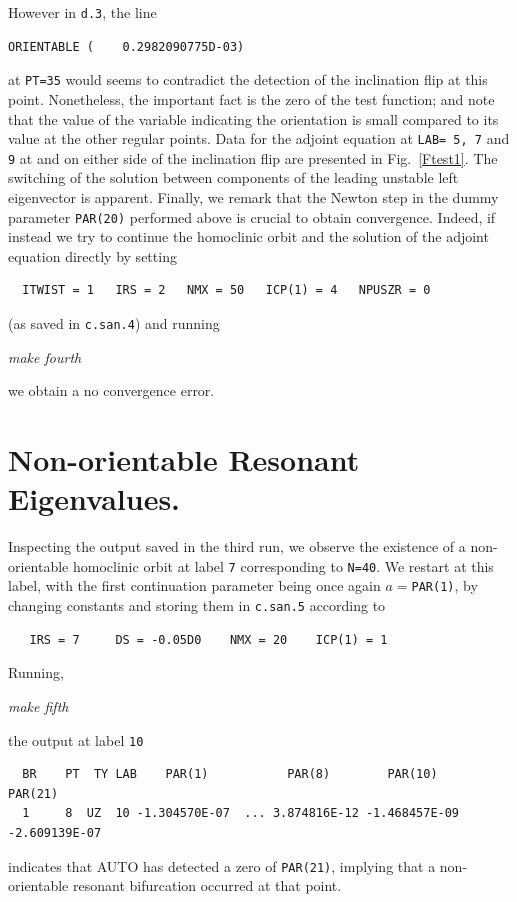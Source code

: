 \documentclass[12pt]{report}
\begin{document}
However in {\tt d.3}, the line 
\begin{verbatim} 
ORIENTABLE (    0.2982090775D-03)
\end{verbatim}
at {\tt PT=35} would seems to contradict the 
detection of the inclination flip at this point. Nonetheless, the
important fact is the zero of the test function; and note that 
the value of the variable indicating the orientation is 
small compared to its value at the other regular points. 
Data for the adjoint equation at {\tt LAB= 5, 7} and {\tt 9} at
and on either side of the inclination flip are presented in 
Fig.\ \ref{Ftest1}. The switching of the solution between components
of the leading unstable left eigenvector is apparent.
Finally, we remark that the Newton step in the dummy 
parameter {\tt PAR(20)} performed above is crucial
to obtain convergence. Indeed, if instead we try to continue the
homoclinic orbit and the solution of the adjoint equation directly by
setting
\begin{verbatim}
  ITWIST = 1   IRS = 2   NMX = 50   ICP(1) = 4   NPUSZR = 0
\end{verbatim}
(as saved in {\tt c.san.4}) and running
\begin{center}
{\it make fourth}
\end{center}
we obtain a no convergence error.

\section{Non-orientable Resonant Eigenvalues.}
Inspecting the output saved in the third run,
we observe the existence of a non-orientable homoclinic orbit at label 
{\tt 7} corresponding to {\tt N=40}. We restart at this label, with
the first continuation parameter being once again $a=${\tt PAR(1)}, 
by changing constants and storing them in {\tt c.san.5} according to 
\begin{verbatim}
   IRS = 7     DS = -0.05D0    NMX = 20    ICP(1) = 1
\end{verbatim}
Running, 
 \begin{center}
{\it make fifth}\\
\end{center}
the output at label {\tt 10}
\begin{verbatim}
  BR    PT  TY LAB    PAR(1)           PAR(8)        PAR(10)       PAR(21)       
  1     8  UZ  10 -1.304570E-07  ... 3.874816E-12 -1.468457E-09 -2.609139E-07 
\end{verbatim}
indicates that {\cal AUTO} has detected a zero of
{\tt PAR(21)}, implying that a non-orientable resonant bifurcation occurred at that
point.
\end{document}
